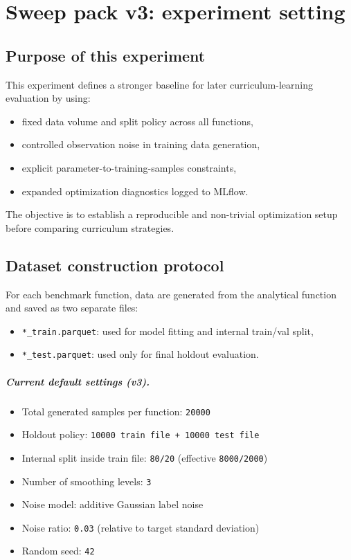 \chapter{Sweep pack v3: experiment setting}
\label{app:sweep-pack-v3-setup}

\section{Purpose of this experiment}

This experiment defines a stronger baseline for later curriculum-learning
evaluation by using:
\begin{itemize}
    \item fixed data volume and split policy across all functions,
    \item controlled observation noise in training data generation,
    \item explicit parameter-to-training-samples constraints,
    \item expanded optimization diagnostics logged to MLflow.
\end{itemize}

The objective is to establish a reproducible and non-trivial optimization setup
before comparing curriculum strategies.

\section{Dataset construction protocol}

For each benchmark function, data are generated from the analytical function and
saved as two separate files:
\begin{itemize}
    \item \texttt{*\_train.parquet}: used for model fitting and internal train/val split,
    \item \texttt{*\_test.parquet}: used only for final holdout evaluation.
\end{itemize}

\paragraph{Current default settings (v3).}
\begin{itemize}
    \item Total generated samples per function: \texttt{20000}
    \item Holdout policy: \texttt{10000 train file + 10000 test file}
    \item Internal split inside train file: \texttt{80/20} (effective \texttt{8000/2000})
    \item Number of smoothing levels: \texttt{3}
    \item Noise model: additive Gaussian label noise
    \item Noise ratio: \texttt{0.03} (relative to target standard deviation)
    \item Random seed: \texttt{42}
\end{itemize}

